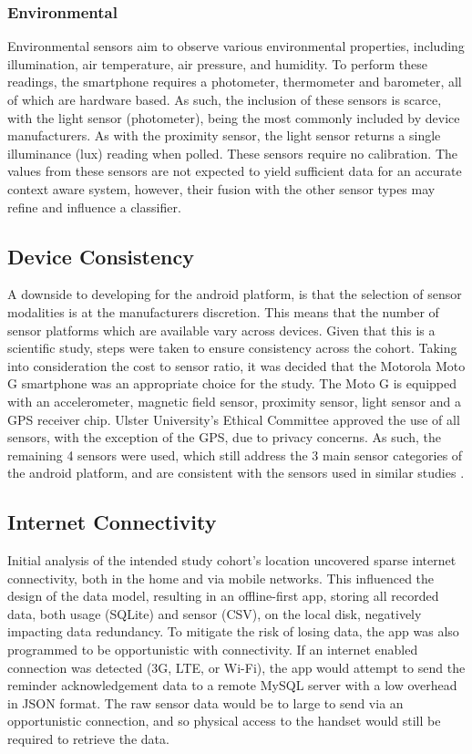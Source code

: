\subsubsection{Environmental}
Environmental sensors aim to observe various environmental properties, including illumination, air temperature, air pressure, and humidity. To perform these readings, the smartphone requires a photometer, thermometer and barometer, all of which are hardware based. As such, the inclusion of these sensors is scarce, with the light sensor (photometer), being the most commonly included by device manufacturers. As with the proximity sensor, the light sensor returns a single illuminance (lux) reading when polled. These sensors require no calibration. The values from these sensors are not expected to yield sufficient data for an accurate context aware system, however, their fusion with the other sensor types may refine and influence a classifier.


\subsection{Device Consistency} \label{subsection: taut-deviceconsistency}
A downside to developing for the android platform, is that the selection of sensor modalities is at the manufacturers discretion. This means that the number of sensor platforms which are available vary across devices. Given that this is a scientific study, steps were taken to ensure consistency across the cohort. Taking into consideration the cost to sensor ratio, it was decided that the Motorola Moto G smartphone was an appropriate choice for the study. The Moto G is equipped with an accelerometer, magnetic field sensor, proximity sensor, light sensor and a GPS receiver chip. Ulster University's Ethical Committee approved the use of all sensors, with the exception of the GPS, due to privacy concerns. As such, the remaining 4 sensors were used, which still address the 3 main sensor categories of the android platform, and are consistent with the sensors used in similar studies \cite{Poppinga2014}.

\subsection{Internet Connectivity}
Initial analysis of the intended study cohort's location uncovered sparse internet connectivity, both in the home and via mobile networks. This influenced the design of the data model, resulting in an offline-first app, storing all recorded data, both usage (SQLite) and sensor (CSV), on the local disk, negatively impacting data redundancy. To mitigate the risk of losing data, the app was also programmed to be opportunistic with connectivity. If an internet enabled connection was detected (3G, LTE, or Wi-Fi), the app would attempt to send the reminder acknowledgement data to a remote MySQL server with a low overhead in JSON format. The raw sensor data would be to large to send via an opportunistic connection, and so physical access to the handset would still be required to retrieve the data.

